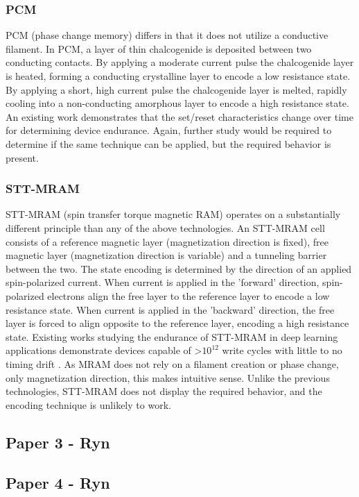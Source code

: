 \documentclass[sigconf,authoryear]{acmart}
\begin{document}
\subsubsection{PCM}
PCM (phase change memory) differs in that it does not utilize a conductive filament. In PCM, a layer of thin chalcogenide is deposited 
between two conducting contacts. By applying a moderate current pulse the chalcogenide layer is heated, forming a conducting 
crystalline layer to encode a low resistance state. By applying a short, high current pulse the chalcogenide layer is melted, 
rapidly cooling into a non-conducting amorphous layer to encode a high resistance state. An existing work demonstrates 
that the set/reset characteristics change over time \cite{PCM} for determining device endurance. Again, further study would be 
required to determine if the same technique can be applied, but the required behavior is present.

\subsubsection{STT-MRAM}
STT-MRAM (spin transfer torque magnetic RAM) operates on a substantially different principle than any of the above technologies. 
An STT-MRAM cell consists of a reference magnetic layer (magnetization direction is fixed), free magnetic layer (magnetization direction 
is variable) and a tunneling barrier between the two. The state encoding is determined by the direction of an applied spin-polarized 
current. When current is applied in the 'forward' direction, spin-polarized electrons align the free layer to the reference layer to  
encode a low resistance state. When current is applied in the 'backward' direction, the free layer is forced to align opposite to the 
reference layer, encoding a high resistance state. Existing works studying the endurance of STT-MRAM in deep learning applications 
demonstrate devices capable of >$10^{12}$ write cycles with little to no timing drift \cite{MRAM}. As MRAM does not rely on a 
filament creation or phase change, only magnetization direction, this makes intuitive sense. Unlike the previous technologies, 
STT-MRAM does not display the required behavior, and the encoding technique is unlikely to work.


\subsection{Paper 3 - Ryn}


\subsection{Paper 4 - Ryn } 
\end{document}
